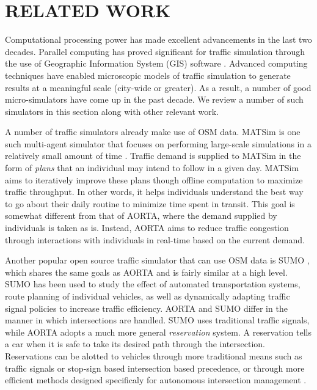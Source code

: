 \documentclass[letterpaper, 10 pt, conference]{ieeeconf}  %
\begin{document}

\section{RELATED WORK}
\label{sec:related_work}

Computational processing power has made excellent advancements in the last two decades. Parallel computing has proved significant for traffic simulation through the use of Geographic Information System (GIS) software \cite{pursula1999simulation}. Advanced computing techniques have enabled microscopic models of traffic simulation to generate results at a meaningful scale (city-wide or greater). As a result, a number of good micro-simulators have come up in the past decade. We review a number of such simulators in this section along with other relevant work.  

A number of traffic simulators already make use of OSM data. MATSim is one such multi-agent simulator that focuses on performing large-scale simulations in a relatively small amount of time \cite{balmer2009matsim}. Traffic demand is supplied to MATSim in the form of \textit{plans} that an individual may intend to follow in a given day. MATSim aims to iteratively improve these plans though offline computation to maximize traffic throughput. In other words, it helps individuals understand the best way to go about their daily routine to minimize time spent in transit. This goal is somewhat different from that of AORTA, where the demand supplied by individuals is taken as is. Instead, AORTA aims to reduce traffic congestion through interactions with individuals in real-time based on the current demand.

Another popular open source traffic simulator that can use OSM data is SUMO \cite{SUMO2011}, which shares the same goals as AORTA and is fairly similar at a high level. SUMO has been used to study the effect of automated transportation systems, route planning of individual vehicles, as well as dynamically adapting traffic signal policies to increase traffic efficiency. AORTA and SUMO differ in the manner in which intersections are handled. SUMO uses traditional traffic signals, while AORTA adopts a much more general \textit{reservation} system. A reservation tells a car when it is safe to take its desired path through the intersection. Reservations can be alotted to vehicles through more traditional means such as traffic signals or stop-sign based intersection based precedence, or through more efficient methods designed specificaly for autonomous intersection management \cite{JAIR08-dresner}.   
\end{document}
